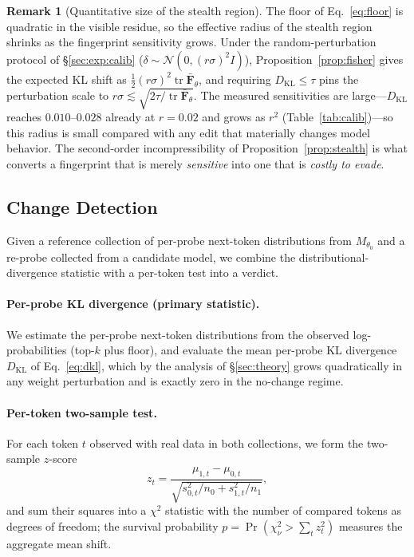 \documentclass[11pt]{article}
\theoremstyle{definition}
\newtheorem{remark}{Remark}
\begin{document}
\begin{remark}[Quantitative size of the stealth region]
\label{rem:advscale}
The floor of Eq.~\eqref{eq:floor} is quadratic in the visible residue, so the
effective radius of the stealth region shrinks as the fingerprint sensitivity
grows. Under the random-perturbation protocol of \S\ref{sec:exp:calib}
($\delta \sim \mathcal{N}(0, (r\sigma)^2 I)$),
Proposition~\ref{prop:fisher} gives the expected KL shift as
$\tfrac12 (r\sigma)^2 \operatorname{tr}\bar{\bm{F}}_\theta$, and requiring
$D_{\mathrm{KL}} \le \tau$ pins the perturbation scale to
$r\sigma \lesssim \sqrt{2\tau \big/ \operatorname{tr}\bar{\bm{F}}_\theta}$.
The measured sensitivities are large---$D_{\mathrm{KL}}$ reaches
$0.010$--$0.028$ already at $r = 0.02$ and grows as $r^2$
(Table~\ref{tab:calib})---so this radius is small compared with any edit that
materially changes model behavior. The second-order incompressibility of
Proposition~\ref{prop:stealth} is what converts a fingerprint that is merely
\emph{sensitive} into one that is \emph{costly to evade}.
\end{remark}

\subsection{Change Detection}
\label{sec:detect}

Given a reference collection of per-probe next-token distributions from
$M_{\theta_0}$ and a re-probe collected from a candidate model, we combine the
distributional-divergence statistic with a per-token test into a verdict.

\paragraph{Per-probe KL divergence (primary statistic).}
We estimate the per-probe next-token distributions from the observed
log-probabilities (top-$k$ plus floor), and evaluate the mean per-probe KL
divergence $D_{\mathrm{KL}}$ of Eq.~\eqref{eq:dkl}, which by the analysis of
\S\ref{sec:theory} grows quadratically in any weight perturbation and is
exactly zero in the no-change regime.

\paragraph{Per-token two-sample test.}
For each token $t$ observed with real data in both collections, we form the
two-sample $z$-score
\begin{equation}
  z_t = \frac{\mu_{1,t} - \mu_{0,t}}{\sqrt{s_{0,t}^2/n_0 + s_{1,t}^2/n_1}},
  \label{eq:z}
\end{equation}
and sum their squares into a $\chi^2$ statistic with the number of compared
tokens as degrees of freedom; the survival probability $p = \Pr(\chi^2_\nu >
\sum_t z_t^2)$ measures the aggregate mean shift.
\end{document}
